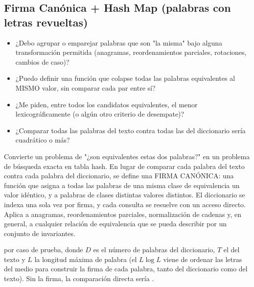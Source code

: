 \subsection{Firma Canónica + Hash Map (palabras con letras revueltas)}
\label{alg:9-5}


\begin{itemize}
\item ¿Debo agrupar o emparejar palabras que son "la misma" bajo alguna transformación permitida (anagramas, reordenamientos parciales, rotaciones, cambios de caso)?
\item ¿Puedo definir una función que colapse todas las palabras equivalentes al MISMO valor, sin comparar cada par entre sí?
\item ¿Me piden, entre todos los candidatos equivalentes, el menor lexicográficamente (o algún otro criterio de desempate)?
\item ¿Comparar todas las palabras del texto contra todas las del diccionario sería cuadrático o más?
\end{itemize}

 Convierte un problema de "¿son equivalentes estas dos palabras?" en un problema de búsqueda exacta en tabla hash. En lugar de comparar cada palabra del texto contra cada palabra del diccionario, se define una FIRMA CANÓNICA: una función que asigna a todas las palabras de una misma clase de equivalencia un valor idéntico, y a palabras de clases distintas valores distintos. El diccionario se indexa una sola vez por firma, y cada consulta se resuelve con un acceso directo. Aplica a anagramas, reordenamientos parciales, normalización de cadenas y, en general, a cualquier relación de equivalencia que se pueda describir por un conjunto de invariantes.

  por caso de prueba, donde $D$ es el número de palabras del diccionario, $T$ el del texto y $L$ la longitud máxima de palabra (el $L \log L$ viene de ordenar las letras del medio para construir la firma de cada palabra, tanto del diccionario como del texto). Sin la firma, la comparación directa sería .

